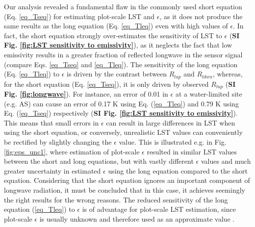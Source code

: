 \documentclass[fleqn,10pt]{wlscirep}
\begin{document}
Our analysis revealed a fundamental flaw in the commonly used short equation (Eq. \ref{eq_Tseq}) for estimating plot-scale LST and $\epsilon$, as it does not produce the same results as the long equation (Eq. \ref{eq_Tleq}) even with high values of $\epsilon$. In fact, the short equation strongly over-estimates the sensitivity of LST to $\epsilon$ (\textbf{SI Fig. \ref{fig:LST sensitivity to emissivity}}), as it neglects the fact that low emissivity results in a greater fraction of reflected longwave in the sensor signal (compare Eqs. \ref{eq_Tseq} and \ref{eq_Tleq}). The sensitivity of the long equation (Eq. \ref{eq_Tleq}) to $\epsilon$ is driven by the contrast between $R_{lup}$ and $R_{ldwn}$, whereas, for the short equation (Eq. \ref{eq_Tseq}), it is only driven by observed $R_{lup}$ (\textbf{SI Fig. \ref{fig:longwave}}). For instance, an error of 0.01 in $\epsilon$ at a water-limited site (e.g. AS) can cause an error of 0.17 K using Eq. (\ref{eq_Tleq}) and 0.79 K using Eq. (\ref{eq_Tseq}) respectively (\textbf{SI Fig. \ref{fig:LST sensitivity to emissivity}}). 
This means that small errors in $\epsilon$ can result in large differences in LST when using the short equation, or conversely, unrealistic LST values can conveniently be rectified by slightly changing the $\epsilon$ value. 
This is illustrated e.g. in Fig. \ref{fig:eps_unc1}, where estimation of plot-scale $\epsilon$ resulted in similar LST values between the short and long equations, but with vastly different $\epsilon$ values and much greater uncertainty in estimated $\epsilon$ using the long equation compared to the short equation. Considering that the short equation ignores an important component of longwave radiation, it must be concluded that in this case, it achieves seemingly the right results for the wrong reasons.  %
The reduced sensitivity of the long equation (\ref{eq_Tleq}) to $\epsilon$ is of advantage for plot-scale LST estimation, since plot-scale $\epsilon$ is usually unknown and therefore used as an approximate value \cite{mallick2018bridging}. %
\end{document}
